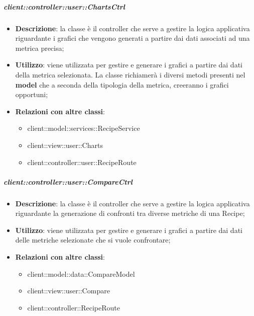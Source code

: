 		\subparagraph{client::controller::user::ChartsCtrl} %
		\label{subp:client_controller_user_chartsctrl}
			\begin{itemize}
				\item \textbf{Descrizione}: la classe è il controller che serve a gestire la logica applicativa riguardante i grafici che vengono generati a partire dai dati associati ad una metrica precisa;
				\item \textbf{Utilizzo}: viene utilizzata per gestire e generare i grafici a partire dai dati della metrica selezionata. La classe richiamerà i diversi metodi presenti nel \textbf{model} che a seconda della tipologia della metrica, creeranno i grafici opportuni;
				\item \textbf{Relazioni con altre classi}:
					\begin{itemize}
						\item client::model::services::RecipeService
						\item client::view::user::Charts
						\item client::controller::user::RecipeRoute
					\end{itemize}
			\end{itemize}

		\subparagraph{client::controller::user::CompareCtrl} %
		\label{subp:client_controller_user_comparectrl}
			\begin{itemize}
				\item \textbf{Descrizione}: la classe è il controller che serve a gestire la logica applicativa riguardante la generazione di confronti tra diverse metriche di una Recipe;
				\item \textbf{Utilizzo}: viene utilizzata per gestire e generare i grafici a partire dai dati delle metriche selezionate che si vuole confrontare;
				\item \textbf{Relazioni con altre classi}:
					\begin{itemize}
						\item client::model::data::CompareModel
						\item client::view::user::Compare
						\item client::controller::RecipeRoute
					\end{itemize}
			\end{itemize}

